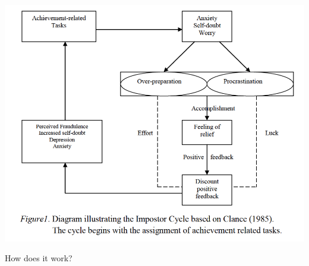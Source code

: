 \documentclass[aspectratio=169]{beamer}
\begin{document}
\begin{frame}
  \begin{center}
    \includegraphics[scale=.5]{./assets/clance-impostor-cycle.png}
    \\ \small \cite{sakulku11}
  \end{center}
\end{frame}

\begin{frame}
  \begin{center}
    \Huge How does it work?
    \small
    \\ \small \cite{hh15}
    \\ \small \cite{langford93}
    \\ \small \cite{colour}
  \end{center}
\end{frame}
\end{document}
